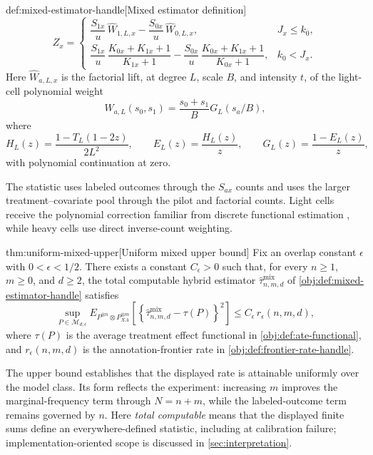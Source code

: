 \begin{algorithmv}{def:mixed-estimator-handle}[Mixed estimator definition]
\[
Z_x
=
\begin{cases}
\dfrac{S_{1x}}u\,\widehat W_{1,L,x}
-
\dfrac{S_{0x}}u\,\widehat W_{0,L,x},
& J_x\le k_0,\\[1.2em]
\dfrac{S_{1x}}u\,\dfrac{K_{0x}+K_{1x}+1}{K_{1x}+1}
-
\dfrac{S_{0x}}u\,\dfrac{K_{0x}+K_{1x}+1}{K_{0x}+1},
& k_0<J_x.
\end{cases}
\]
Here \(\widehat W_{a,L,x}\) is the factorial lift, at degree \(L\), scale \(B\), and intensity \(t\), of the light-cell polynomial weight
\[
W_{a,L}(s_0,s_1)=\frac{s_0+s_1}{B}G_L(s_a/B),
\]
where
\[
H_L(z)=\frac{1-T_L(1-2z)}{2L^2},\qquad
E_L(z)=\frac{H_L(z)}z,\qquad
G_L(z)=\frac{1-E_L(z)}z,
\]
with polynomial continuation at zero.
\end{algorithmv}

The statistic  uses labeled outcomes through the \(S_{ax}\) counts and uses the larger treatment--covariate pool through the pilot and factorial counts. Light cells receive the polynomial correction familiar from discrete functional estimation \citep{JiaoVenkatHanWeissman2015,WuYang2016}, while heavy cells use direct inverse-count weighting.

\begin{theoremv}{thm:uniform-mixed-upper}[Uniform mixed upper bound]
Fix an overlap constant \(\epsilon\) with \(0<\epsilon<1/2\).  There exists a constant \(C_\epsilon>0\) such that, for every \(n\ge 1\), \(m\ge 0\), and \(d\ge 2\), the total computable hybrid estimator \(\widehat\tau^{\mathrm{mix}}_{n,m,d}\) of \cref{obj:def:mixed-estimator-handle} satisfies
\[
\sup_{P\in\mathcal M_{d,\epsilon}}
E_{P^{\otimes n}\otimes P_{XA}^{\otimes m}}
\!\left[
\left\{\widehat\tau^{\mathrm{mix}}_{n,m,d}-\tau(P)\right\}^2
\right]
\le
C_\epsilon\, r_\epsilon(n,m,d),
\]
where \(\tau(P)\) is the average treatment effect functional in \cref{obj:def:ate-functional}, and \(r_\epsilon(n,m,d)\) is the annotation-frontier rate in \cref{obj:def:frontier-rate-handle}.
\end{theoremv}

The upper bound establishes that the displayed rate is attainable uniformly over the model class. Its form reflects the experiment: increasing \(m\) improves the marginal-frequency term through \(N=n+m\), while the labeled-outcome term remains governed by \(n\). Here \emph{total computable} means that the displayed finite sums define an everywhere-defined statistic, including at calibration failure; implementation-oriented scope is discussed in \cref{sec:interpretation}.

